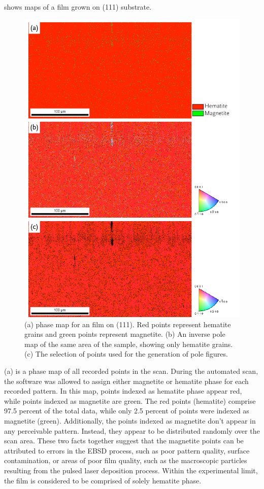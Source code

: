  shows  maps of a film grown on  (111) substrate. 
\begin{figure}
	\includegraphics[width=\textwidth]{111maps.pdf}
	\caption[ maps for film on  (111)]{%
		(a)  phase map for an  film on  
		(111). Red points represent hematite grains and green points 
		represent magnetite. (b) An inverse pole map of the same area 
		of the sample, showing only hematite grains. (c) The selection 
		of points used for the generation of pole figures.}
	\label{fig:111maps}
\end{figure}
(a) is a phase map of all recorded points in the scan. During the
automated scan, the  software was allowed to assign either magnetite or hematite phase
for each recorded pattern. In this map, points indexed as hematite phase appear red, while
points indexed as magnetite are green. The red points (hematite) comprise 97.5 percent of
the total data, while only 2.5 percent of points were indexed as magnetite (green).
Additionally, the points indexed as magnetite don't appear in any perceivable pattern.
Instead, they appear to be distributed randomly over the scan area. These two facts
together suggest that the magnetite points can be attributed to errors in the EBSD
process, such as poor pattern quality, surface contamination, or areas of poor film
quality, such as the macroscopic particles resulting from the pulsed laser deposition
process. Within the experimental limit, the film is considered to be comprised of solely
hematite phase. 

